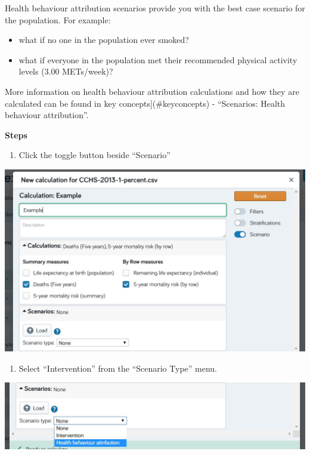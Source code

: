 \documentclass[]{book}
\providecommand{\tightlist}{%
  \setlength{\itemsep}{0pt}\setlength{\parskip}{0pt}}
\begin{document}
Health behaviour attribution scenarios provide you with the best case
scenario for the population. For example:

\begin{itemize}
\tightlist
\item
  what if no one in the population ever smoked?
\item
  what if everyone in the population met their recommended physical
  activity levels (3.00 METs/week)?
\end{itemize}

More information on health behaviour attribution calculations and how
they are calculated can be found in key concepts{]}(\#keyconcepts) -
``Scenarios: Health behaviour attribution''.

\textbf{Steps}

\begin{enumerate}
\def\labelenumi{\arabic{enumi}.}
\tightlist
\item
  Click the toggle button beside ``Scenario''
\end{enumerate}

\begin{center}\includegraphics{Images/Scenario} \end{center}

\begin{enumerate}
\def\labelenumi{\arabic{enumi}.}
\setcounter{enumi}{1}
\tightlist
\item
  Select ``Intervention'' from the ``Scenario Type'' menu.
\end{enumerate}

\begin{center}\includegraphics{Images/Scenario-HBattribution} \end{center}
\end{document}
